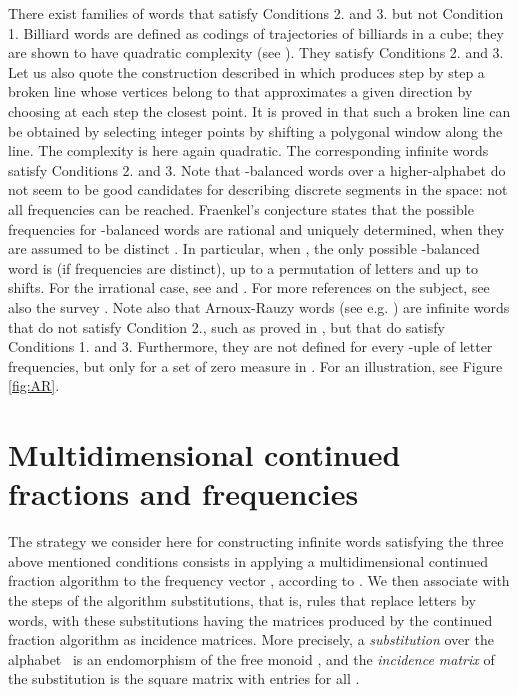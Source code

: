 \documentclass[preliminary,copyright,creativecommons]{eptcs}
\begin{document}
There exist families of words  that   satisfy  Conditions 2. and  3.    but not Condition 1. Billiard words   are defined as codings of  trajectories of billiards in a cube;
they  are shown to have quadratic complexity  (see   \cite{amst1,Baryshnikov:1995}).  They satisfy  Conditions 2. and  3. Let us also  quote   the construction   described in  \cite{Chevallier:09}   which produces step by step a broken line whose vertices  belong to
   that approximates a given  direction  by choosing at each step the  closest point. It is proved
  in  \cite{Chevallier:09} that such a  broken line can be  obtained by selecting  integer points   by shifting a polygonal
  window  along the line.  The complexity is here again quadratic.      The corresponding infinite words  satisfy  Conditions 2. and  3. 
  Note that  -balanced words over a higher-alphabet do not seem to be   good candidates
for   describing   discrete segments in the space: not all frequencies can be reached.  Fraenkel's conjecture states  that    the  possible  frequencies   for  -balanced  words   are rational  and uniquely determined, when  they are assumed   to be   distinct \cite{Fra73}. In particular,
when , the only possible  -balanced  word is  (if frequencies are distinct),
up to a permutation of letters  and up to shifts.  For the irrational case, see \cite{Hub00} and \cite{Graham}.  For more references on the subject, see also   the survey \cite{Vui}.
Note also  that Arnoux-Rauzy    words  (see e.g. \cite{arnrau91,CFZ,CFM})  are 
infinite words   that do not satisfy Condition  2.,  such as proved  in  \cite{CFZ}, but that do  satisfy Conditions 1. and 3.  Furthermore,
they are not defined for every -uple of letter frequencies, but     only for a set of zero measure in .  For an illustration, see Figure \ref{fig:AR}.
\section{Multidimensional continued fractions and frequencies}
  
  The strategy we consider here     for   constructing  infinite words satisfying  the three  above mentioned conditions  consists in   applying a multidimensional continued fraction algorithm to the
  frequency vector , according to \cite{BLab}.  We then   associate  with the steps of the algorithm substitutions, that is, rules that  replace 
letters by words,   with these substitutions having   the  matrices   produced by the continued fraction algorithm   as incidence matrices. More precisely,
 a {\em substitution}  over the   alphabet~ is an endomorphism of the free monoid
, and the  {\em incidence matrix}  of the substitution  is the square matrix  with entries   for all .
\end{document}
